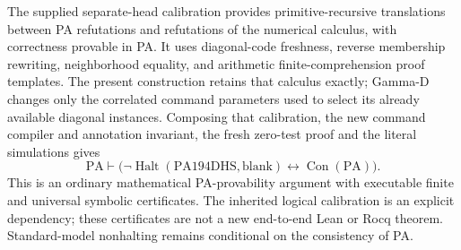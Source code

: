 The supplied separate-head calibration provides primitive-recursive
translations between PA refutations and refutations of the numerical
calculus, with correctness provable in PA. It uses diagonal-code freshness,
reverse membership rewriting, neighborhood equality, and arithmetic
finite-comprehension proof templates. The present construction retains
that calculus exactly; Gamma-D changes only the correlated command
parameters used to select its already available diagonal instances.
Composing that calibration, the new command compiler and annotation
invariant, the fresh zero-test proof and the literal simulations gives
\[
 \mathrm{PA}\vdash
 \bigl(\neg\operatorname{Halt}(\mathrm{PA194DHS},\mathrm{blank})
             \leftrightarrow\operatorname{Con}(\mathrm{PA})\bigr).
\]
This is an ordinary mathematical PA-provability argument with executable
finite and universal symbolic certificates. The inherited logical
calibration is an explicit dependency; these certificates are not a
new end-to-end Lean or Rocq theorem. Standard-model nonhalting remains
conditional on the consistency of PA.
